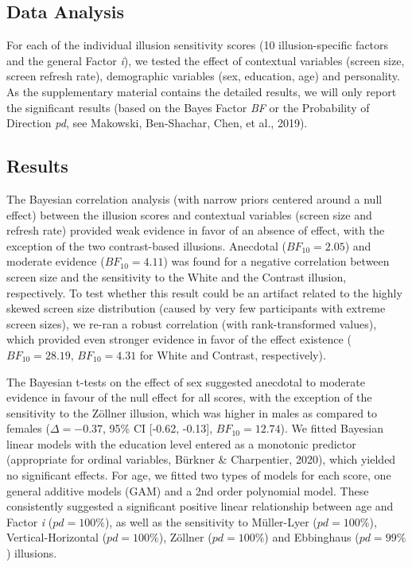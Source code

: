 \documentclass[
  man,floatsintext]{apa6}
\begin{document}
\hypertarget{data-analysis-2}{%
\subsection{Data Analysis}\label{data-analysis-2}}

For each of the individual illusion sensitivity scores (10 illusion-specific factors and the general Factor \emph{i}), we tested the effect of contextual variables (screen size, screen refresh rate), demographic variables (sex, education, age) and personality. As the supplementary material contains the detailed results, we will only report the significant results (based on the Bayes Factor \emph{BF} or the Probability of Direction \emph{pd}, see Makowski, Ben-Shachar, Chen, et al., 2019).

\hypertarget{results-2}{%
\subsection{Results}\label{results-2}}

The Bayesian correlation analysis (with narrow priors centered around a null effect) between the illusion scores and contextual variables (screen size and refresh rate) provided weak evidence in favor of an absence of effect, with the exception of the two contrast-based illusions. Anecdotal (\(BF_{10} = 2.05\)) and moderate evidence (\(BF_{10} = 4.11\)) was found for a negative correlation between screen size and the sensitivity to the White and the Contrast illusion, respectively. To test whether this result could be an artifact related to the highly skewed screen size distribution (caused by very few participants with extreme screen sizes), we re-ran a robust correlation (with rank-transformed values), which provided even stronger evidence in favor of the effect existence (\(BF_{10} = 28.19\), \(BF_{10} = 4.31\) for White and Contrast, respectively).

The Bayesian t-tests on the effect of sex suggested anecdotal to moderate evidence in favour of the null effect for all scores, with the exception of the sensitivity to the Zöllner illusion, which was higher in males as compared to females (\(\Delta=-0.37\), 95\% CI {[}-0.62, -0.13{]}, \(BF_{10} = 12.74\)). We fitted Bayesian linear models with the education level entered as a monotonic predictor (appropriate for ordinal variables, Bürkner \& Charpentier, 2020), which yielded no significant effects. For age, we fitted two types of models for each score, one general additive models (GAM) and a 2nd order polynomial model. These consistently suggested a significant positive linear relationship between age and Factor \emph{i} (\(pd=100\%\)), as well as the sensitivity to Müller-Lyer (\(pd=100\%\)), Vertical-Horizontal (\(pd=100\%\)), Zöllner (\(pd=100\%\)) and Ebbinghaus (\(pd=99\%\)) illusions.
\end{document}
